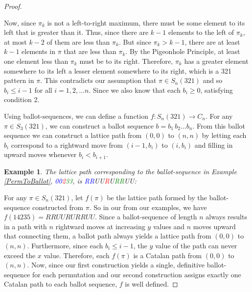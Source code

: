 \documentclass[12pt]{article}
\newtheorem{ex}{Example} %
\begin{document}
\begin{proof}
\begin{enumerate}
        Now, since $\pi_k$ is not a left-to-right maximum, there must be some element to its left that is greater than it. Thus, since there are $k-1$ elements to the left of $\pi_k$, at most $k-2$ of them are less than $\pi_k$. But since $\pi_k>k-1$, there are at least $k-1$ elements in $\pi$ that are less than $\pi_k$. By the Pigeonhole Principle, at least one element less than $\pi_k$ must be to its right. Therefore, $\pi_k$ has a greater element somewhere to its left a lesser element somewhere to its right, which is a 321 pattern in $\pi$. This contradicts our assumption that $\pi\in S_n(321)$ and so $b_i\leq i-1$ for all $i=1,2,\dots n$. Since we also know that each $b_i\geq0$, satisfying condition 2.
    \end{enumerate}
    Using ballot-sequences, we can define a function $f:S_n(321)\rightarrow C_n$. For any $\pi\in S_3(321)$, we can construct a ballot sequence $b=b_1\,b_2\dots b_n$. From this ballot sequence we can construct a lattice path from $(0,0)$ to $(n,n)$ by letting each $b_i$ correspond to a rightward move from $(i-1,b_i)$ to $(i,b_i)$ and filling in upward moves whenever $b_i<b_{i+1}$. 
    \begin{ex}\label{BallotToPath}
        The lattice path corresponding to the ballot-sequence in Example \ref{PermToBallot}, \textcolor{blue}{00}\textcolor{red}{2}\textcolor{green}{33}, is \textcolor{blue}{RR}UU\textcolor{red}{R}U\textcolor{green}{RR}UU:\\
    
    
    \begin{center}
    \end{center}
    \end{ex}
    \vspace{1cm}
    For any $\pi\in S_n(321)$, let $f(\pi)$ be the lattice path formed by the ballot-sequence constructed from $\pi$. So in our from our examples, we have $f(14235)=RRUURURRUU$. Since a ballot-sequence of length $n$ always results in a path with $n$ rightward moves at increasing $y$ values and $n$ moves upward that connecting them, a ballot path always yields a lattice path from $(0,0)$ to $(n,n)$. Furthermore, since each $b_i\leq i-1$, the $y$ value of the path can never exceed the $x$ value. Therefore, each $f(\pi)$ is a Catalan path from $(0,0)$ to $(n,n)$. Now, since our first construction yields a single, definitive ballot-sequence for each permutation and our second construction assigns exactly one Catalan path to each ballot sequence, $f$ is well defined.


\end{proof}
\end{document}
